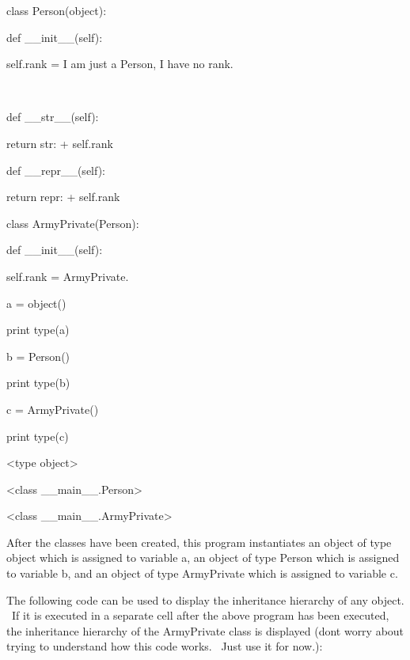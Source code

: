 \documentclass[12pt,twoside]{book}
\begin{document}
\bigskip

class Person(object):

 def \_\_init\_\_(self):

  self.rank = {\textquotedbl}I am just a Person, I have no rank.{\textquotedbl}

\ \ 

 def \_\_str\_\_(self):

  return {\textquotedbl}str: {\textquotedbl} + self.rank

  

 def \_\_repr\_\_(self):

  return {\textquotedbl}repr: {\textquotedbl} + self.rank


\bigskip


\bigskip

class ArmyPrivate(Person):

 def \_\_init\_\_(self):

  self.rank = {\textquotedbl}ArmyPrivate.{\textquotedbl}


\bigskip


\bigskip

a = object()

print type(a)



b = Person()

print type(b)


\bigskip

c = ArmyPrivate()

print type(c)

{\textbar}

{\textless}type {\textquotesingle}object{\textquotesingle}{\textgreater}

{\textless}class {\textquotesingle}\_\_main\_\_.Person{\textquotesingle}{\textgreater}

{\textless}class {\textquotesingle}\_\_main\_\_.ArmyPrivate{\textquotesingle}{\textgreater}


\bigskip


\bigskip

After the classes have been created, this program instantiates an object of type object which is assigned to variable {\textquotesingle}a{\textquotesingle}, an object of type Person which is assigned to variable {\textquotesingle}b{\textquotesingle}, and an object of type ArmyPrivate which is assigned to variable {\textquotesingle}c{\textquotesingle}. 

\bigskip

The following code can be used to display the inheritance hierarchy of any object. \ If it is executed in a separate cell after the above program has been executed, the inheritance hierarchy of the ArmyPrivate class is displayed (don{\textquotesingle}t worry about trying to understand how this code works. \ Just use it for now.): 
\end{document}
